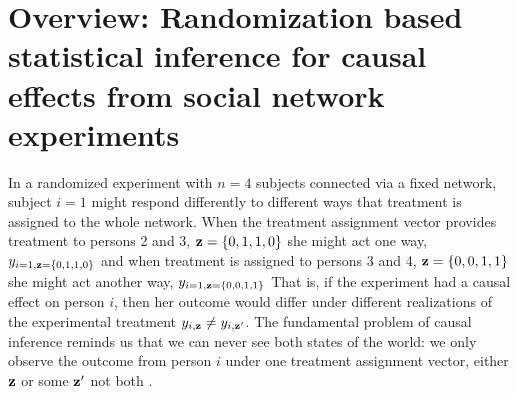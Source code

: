 

\section{Overview: Randomization based statistical inference for causal effects from social network experiments}

In a randomized experiment with $n=4$ subjects connected via a fixed network,
subject $i=1$ might respond differently to different ways that treatment is
assigned to the whole network. When the treatment assignment vector provides
treatment to persons 2 and 3, $\mathbf{z}=\{0,1,1,0\}$ she might act one way,
$y_{i=1,\mathbf{z}=\{0,1,1,0\}}$ and when treatment is assigned to persons 3 and 4,
$\mathbf{z}=\{0,0,1,1\}$ she might act another way, $y_{i=1,\mathbf{z}=\{0,0,1,1\}}$ That
is, if the experiment had a causal effect on person $i$, then her outcome
would differ under different realizations of the experimental treatment
$y_{i,\mathbf{z}} \ne y_{i,\mathbf{z}'}$. The fundamental problem of causal inference
reminds us that we can never see both states of the world: we only observe the
outcome from person $i$ under one treatment assignment vector, either $\mathbf{z}$ or
some $\mathbf{z}'$ not both  \citep{holland:1986a,brady2008cae}.

